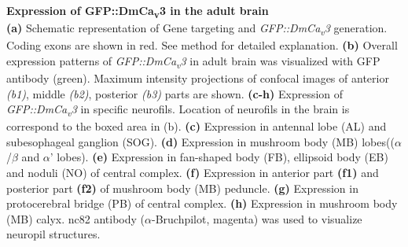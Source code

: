 \label{fig:2} 
\textbf{Expression of GFP::DmCa\textsubscript{v}3 in the adult brain} 
\\ 
\textbf{(a)} Schematic representation of Gene targeting and \emph{GFP::DmCa\textsubscript{v}3} generation. 
Coding exons are shown in red. 
See method for detailed explanation.
\textbf{(b)} Overall expression patterns of \emph{GFP::DmCa\textsubscript{v}3} in adult brain was visualized with GFP antibody (green). 
Maximum intensity projections of confocal images of anterior \emph{(b1)}, middle \emph{(b2)}, posterior \emph{(b3)} parts are shown.
\textbf{(c-h)} Expression of \emph{GFP::DmCa\textsubscript{v}3} in specific neurofils. Location of neurofils in the brain is correspond to the boxed area in (b).
\textbf{(c)} Expression in antennal lobe (AL) and subesophageal ganglion (SOG).
\textbf{(d)} Expression in mushroom body (MB) lobes(($\alpha$/$\beta$ and $\alpha$\textquoteright{} lobes). 
\textbf{(e)} Expression in fan-shaped body (FB), ellipsoid body (EB) and noduli (NO) of central complex.
\textbf{(f)} Expression in anterior part \textbf{(f1)} and posterior part \textbf{(f2)} of mushroom body (MB) peduncle.
\textbf{(g)} Expression in protocerebral bridge (PB) of central complex. 
\textbf{(h)} Expression in mushroom body (MB) calyx. 
nc82  antibody ($\alpha$-Bruchpilot, magenta) was used to visualize neuropil structures. 

  
  
  
  
  
  
  